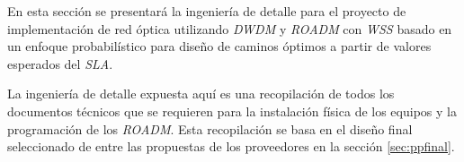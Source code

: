  
 
 
 
 

En esta sección se presentará la ingeniería de detalle para el
proyecto de implementación de red óptica utilizando \emph{DWDM} y
\emph{ROADM} con \emph{WSS} basado en un enfoque probabilístico para
diseño de caminos óptimos a partir de valores esperados del
\emph{SLA}.

La ingeniería de detalle expuesta aquí es una recopilación de todos
los documentos técnicos que se requieren para la instalación física de
los equipos y la programación de los \emph{ROADM}. Esta recopilación
se basa en el diseño final seleccionado de entre las propuestas de los
proveedores en la sección \ref{sec:ppfinal}.
